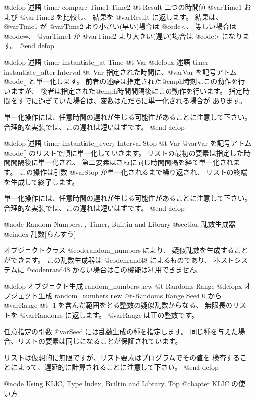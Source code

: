 {{{{@defop {述語} {timer} compare Time1 Time2 @t{-}Result
二つの時間値 @var{Time1} および @var{Time2} を比較し、
結果を @var{Result} に返します。
結果は、@var{Time1} が @var{Time2} より小さい(早い)場合は @code{<}、
等しい場合は @code{=}、
@var{Time1} が @var{Time2} より大きい(遅い)場合は @code{>} になります。
@end defop

@defop {述語} {timer} instantiate_at Time @t{-}Var
@defopx {述語} {timer} instantiate_after Interval @t{-}Var
指定された時間に、@var{Var} を記号アトム @code{[]} と単一化します。
前者の述語は指定された@emph{時刻に}この動作を行いますが、
後者は指定された@emph{時間間隔後に}この動作を行います。
指定時間をすでに過ぎていた場合は、変数はただちに単一化される場合が
あります。

単一化操作には、任意時間の遅れが生じる可能性があることに注意して下さい。
合理的な実装では、この遅れは短いはずです。
@end defop

@defop {述語} {timer} instantiate_every Interval Stop @t{-}Var
@var{Var} を記号アトム @code{[]} のリストで順に単一化していきます。
リストの最初の要素は指定した時間間隔後に単一化され、
第二要素はさらに同じ時間間隔を経て単一化されます。
この操作は引数 @var{Stop} が単一化されるまで繰り返され、
リストの終端を生成して終了します。

単一化操作には、任意時間の遅れが生じる可能性があることに注意して下さい。
合理的な実装では、この遅れは短いはずです。
@end defop

@node Random Numbers,  , Timer, Builtin and Library
@section 乱数生成器
@cindex 乱数[らんすう]

オブジェクトクラス @code{random_numbers} により、
疑似乱数を生成することができます。
この乱数生成器は @code{nrand48} によるものであり、
ホストシステムに @code{nrand48} がない場合はこの機能は利用できません。

@defop {オブジェクト生成} random_numbers new @t{-}Randoms Range
@defopx {オブジェクト生成} random_numbers new @t{-}Randoms Range Seed
0 から @var{Range} @t{-} 1 を含んだ範囲をとる整数の疑似乱数からなる、
無限長のリストを @var{Randoms} に返します。 
@var{Range} は正の整数です。

任意指定の引数 @var{Seed} には乱数生成の種を指定します。
同じ種を与えた場合、リストの要素は同じになることが保証されています。

リストは仮想的に無限ですが、リスト要素はプログラムでその値を
検査することによって、遅延的に計算されることに注意して下さい。
@end defop

@node Using KLIC, Type Index, Builtin and Library, Top
@chapter KLIC の使い方

}}}}
